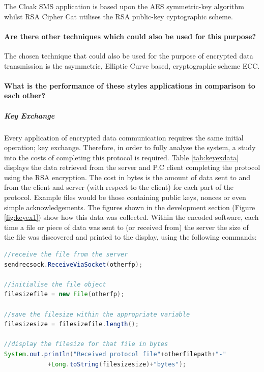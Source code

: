 \documentclass[a4paper,12pt]{report}
\begin{document}
The Cloak SMS application is based upon the AES symmetric-key algorithm whilst RSA Cipher Cat utilises the RSA public-key cyptographic scheme. 

\paragraph{Are there other techniques which could also be used for this purpose?}

The chosen technique that could also be used for the purpose of encrypted data transmission is the asymmetric, Elliptic Curve based, cryptographic scheme ECC.  

\paragraph{What is the performance of these styles applications in comparison to each other?}

\subparagraph{Key Exchange}
Every application of encrypted data communication requires the same initial operation; key exchange. Therefore, in order to fully analyse the system, a study into the costs of completing this protocol is required. Table \ref{tab:keyexdata} displays the data retrieved from the server and P.C client completing the protocol using the RSA encryption. The cost in bytes is the amount of data sent to and from the client and server (with respect to the client) for each part of the protocol. Example files would be those containing public keys, nonces or even simple acknowledgements. The figures shown in the development section (Figure \ref{fig:keyex1}) show how this data was collected. Within the encoded software, each time a file or piece of data was sent to (or received from) the server the size of the file was discovered and printed to the display, using the following commands:

\begin{lstlisting}[language=Java]
//receive the file from the server
sendrecsock.ReceiveViaSocket(otherfp);

//initialise the file object
filesizefile = new File(otherfp);

//save the filesize within the appropriate variable
filesizesize = filesizefile.length();

//display the filesize for that file in bytes
System.out.println("Received protocol file"+otherfilepath+"-"
		    +Long.toString(filesizesize)+"bytes");
\end{lstlisting}
\end{document}
